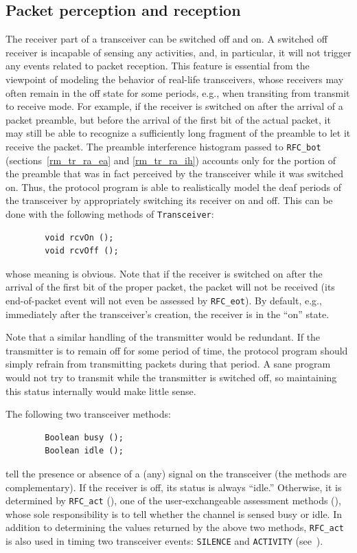 \subsection{Packet perception and reception}
\label{rm_tr_pp}

The receiver part of a transceiver can be switched off and on.
A switched off receiver is incapable of sensing any activities,
and, in particular, it will not trigger any events related to packet reception.
This feature is essential from the viewpoint of modeling the
behavior of real-life transceivers, whose receivers may often remain in
the off state for some periods, e.g., when transiting from transmit
to receive mode.
For example, if the receiver is switched on after the arrival of a packet
preamble, but before the arrival of the first bit of the actual packet,
it may still be able to recognize a sufficiently long fragment of the
preamble to let it receive the packet.
The preamble interference histogram passed to {\tt RFC\_bot}
(sections~\ref{rm_tr_ra_ea} and \ref{rm_tr_ra_ih}) accounts only for the
portion of the preamble that was in fact perceived by the transceiver
while it was switched on.
Thus, the protocol program is able to realistically model the deaf
periods of the transceiver by appropriately switching its receiver on and
off.
This can be done with the following methods of {\tt Transceiver}:
\begin{verbatim}
        void rcvOn ();
        void rcvOff ();
\end{verbatim}
\noindent
whose meaning is obvious.
Note that if the receiver is switched on after the arrival of the first bit
of the proper packet, the packet will not be received (its end-of-packet
event will not even be assessed by {\tt RFC\_eot}).
By default, e.g., immediately after the transceiver's creation, the
receiver is in the ``on'' state.

Note that a similar handling of the transmitter would be redundant.
If the transmitter is to remain off for some period of time, the protocol
program should simply refrain from transmitting packets during that period.
A sane program would not try to transmit while the transmitter is switched
off, so maintaining this status internally would make little sense.

The following two transceiver methods:
\begin{verbatim}
        Boolean busy ();
        Boolean idle ();
\end{verbatim}
\noindent
tell the presence or absence of a (any) signal on the transceiver
(the methods are complementary).
If the receiver is off, its status is always ``idle.''
Otherwise, it is determined by {\tt RFC\_act}
(), one of the user-exchangeable
assessment methods (), whose
sole responsibility is to tell whether the channel is sensed busy or idle.
In addition to determining the values returned by the above two methods,
{\tt RFC\_act} is also used in timing two transceiver events:
{\tt SILENCE} and {\tt ACTIVITY} (see~).

